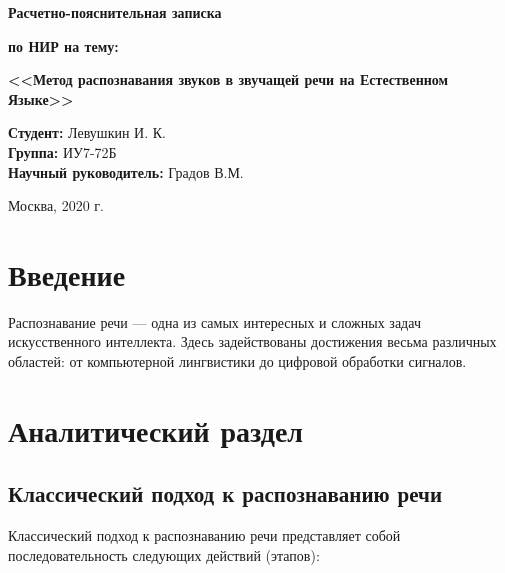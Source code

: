 \documentclass[a4paper,14pt]{extarticle}
\begin{document}
 	\vspace*{30mm}
 	
 	\LARGE
 	\begin{center}
 		\textbf{Расчетно-пояснительная записка}
 		
 		\textbf{по НИР на тему:}
 		
 		\textbf{<<Метод распознавания звуков в звучащей речи на Естественном Языке>>}
 	\end{center}
 	
 	\vspace*{15mm}
 	
 	\large
 	\begin{flushleft}
 		\textbf{Студент:} Левушкин И. К. \\
 		\textbf{Группа:} ИУ7-72Б \\
 		\textbf{Научный руководитель:} Градов В.М.
 	\end{flushleft}
 	
 	\vspace*{50mm}
 	
 	\large
 	\begin{center}
 		Москва, 2020 г.
 	\end{center}
 	
 	\thispagestyle{empty}
 	
 	\newpage
 	
 	\tableofcontents
 	\newpage
 	\section*{Введение}
 	
 	Распознавание речи — одна из самых интересных и сложных задач искусственного интеллекта. Здесь задействованы достижения весьма различных областей: от компьютерной лингвистики до цифровой обработки сигналов.
 	
 	\newpage
 	
 	\section{Аналитический раздел}
 	
 	\subsection{Классический подход к распознаванию речи}
 	
 	Классический подход к распознаванию речи представляет собой последовательность следующих действий (этапов):
 	
\end{document}
